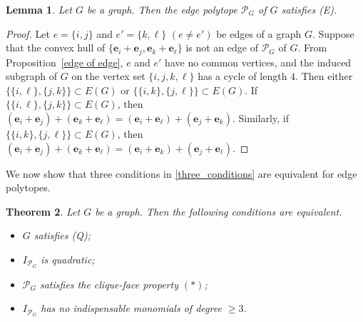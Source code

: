 \documentclass[12pt]{amsart}
\newtheorem{thm}{Theorem} [section]
\newtheorem{lemma}[thm]{Lemma}
\theoremstyle{definition}
\numberwithin{thm}{section}
\numberwithin{equation}{section}
\def\epoly{{\mathcal P}_G}
\def\eb{{\mathbf e}}
\begin{document}
\begin{lemma}\label{edgepolyE}
    Let $G$ be a graph. Then the edge polytope $\epoly$ of $G$ satisfies (E).
\end{lemma}

\begin{proof}
 Let $e = \{i,j\}$ and $e'=\{k,\ell\}$ $(e \ne e')$ be edges of a graph $G$.
Suppose that the convex hull of  $\{\eb_i+\eb_j, \eb_k+\eb_\ell\}$ is not an edge of  $\epoly$ of $G$.
From Proposition~\ref{edge of edge}, 
    $e$ and $e'$ have no common vertices, and the induced subgraph of $G$ on the vertex set $\{i,j,k,\ell\}$ has a cycle of length $4$.
Then either $\{\{i,\ell\}, \{j,k\}\} \subset E(G)$ or $\{\{i,k\}, \{j,\ell\}\} \subset E(G)$.
If $\{\{i,\ell\}, \{j,k\}\} \subset E(G)$, then $(\eb_i+\eb_j) + (\eb_k+\eb_\ell) = (\eb_i+\eb_\ell) + (\eb_j+\eb_k)$.
Similarly, if $\{\{i,k\}, \{j,\ell\}\}  \subset E(G)$, then $(\eb_i+\eb_j) + (\eb_k+\eb_\ell) = (\eb_i+\eb_k) + (\eb_j+\eb_\ell)$.
\end{proof}

We now show that three conditions in \eqref{three_conditions} are equivalent for edge polytopes.


\begin{thm}\label{edge_equivalent}
    Let $G$ be a graph.
    Then the following conditions are equivalent.
    \begin{itemize}
        \item[{\rm (i)}] 
        $G$ satisfies (Q){\rm ;}
    
        \item[{\rm (ii)}] 
        $I_{\epoly}$ is quadratic{\rm ;}

        \item[{\rm (iii)}] 
        $\epoly$ satisfies the clique-face property $(*)${\rm ;}
        \item[{\rm (iv)}] 
        $I_{\epoly}$ has no indispensable monomials of degree $\ge 3$.

    \end{itemize}
\end{thm}
\end{document}
